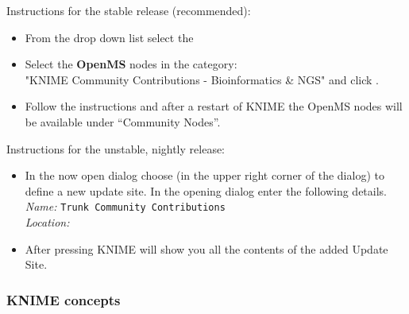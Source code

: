 {
Instructions for the stable release (recommended):
\begin{itemize}
  \item From the  drop down list select the \\ \menu{\KnimeTrustedSite}
  \item Select the \textbf{OpenMS} nodes in the category: \\ "KNIME Community Contributions - Bioinformatics \& NGS" and click .
  \item Follow the instructions and after a restart of KNIME the OpenMS nodes will be available under “Community Nodes”.
\end{itemize}

Instructions for the unstable, nightly release:
\begin{itemize}
  \item \label{it:add_site} In the now open dialog choose  (in the upper right corner of the dialog) to define a new update site. In the opening dialog enter the following details. \\
  \textit{Name:} \texttt{Trunk Community Contributions} \\
  \textit{Location:} \menu{\KnimeTrunkSite}
  \item \label{it:select_site} After pressing  KNIME will show you all the contents of the added Update Site.
\end{itemize}
}

\subsubsection{KNIME concepts}

